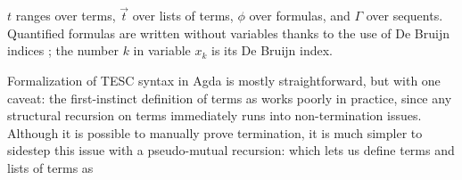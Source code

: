 \documentclass[12pt]{article}
\begin{document}
$t$ ranges over terms, $\vec{t}$ over lists of terms, $\phi$ over formulas, and
$\Gamma$ over sequents.
Quantified formulas are written without variables thanks to the use of De Bruijn 
indices \cite{de1972lambda}; the number $k$ in variable $x_k$ is its De Bruijn index. 

Formalization of TESC syntax in Agda is mostly straightforward, but with one 
caveat: the first-instinct definition of terms as 
works poorly in practice, since any structural recursion on terms immediately 
runs into non-termination issues. Although it is possible to manually prove 
termination, it is much simpler to sidestep this issue with a pseudo-mutual recursion:
which lets us define terms and lists of terms as



\end{document}
